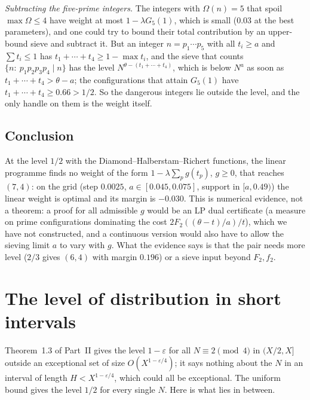 \documentclass[11pt,a4paper]{article}
\theoremstyle{remark}
\theoremstyle{definition}
\newcommand{\e}{\varepsilon}
\begin{document}
\emph{Subtracting the five-prime integers.} The integers with $\Omega(n)=5$ that spoil $\max\Omega\le4$ have weight at most $1-\lambda G_5(1)$, which is small ($0.03$ at the best parameters), and one could try to bound their total contribution by an upper-bound sieve and subtract it. But an integer $n=p_1\cdots p_5$ with all $t_i\ge a$ and $\sum t_i\le1$ has $t_1+\cdots+t_4\ge1-\max t_i$, and the sieve that counts $\{n:\ p_1p_2p_3p_4\mid n\}$ has the level $N^{\theta-(t_1+\cdots+t_4)}$, which is below $N^{a}$ as soon as $t_1+\cdots+t_4>\theta-a$; the configurations that attain $G_5(1)$ have $t_1+\cdots+t_4\ge0.66>1/2$. So the dangerous integers lie outside the level, and the only handle on them is the weight itself.

\subsection{Conclusion}
At the level $1/2$ with the Diamond--Halberstam--Richert functions, the linear programme finds no weight of the form $1-\lambda\sum_pg(t_p)$, $g\ge0$, that reaches $(7,4)$: on the grid (step $0.0025$, $a\in[0.045,0.075]$, support in $[a,0.49)$) the linear weight is optimal and its margin is $-0.030$. This is numerical evidence, not a theorem: a proof for all admissible $g$ would be an LP dual certificate (a measure on prime configurations dominating the cost $2F_2((\theta-t)/a)/t$), which we have not constructed, and a continuous version would also have to allow the sieving limit $a$ to vary with $g$. What the evidence says is that the pair needs more level ($2/3$ gives $(6,4)$ with margin $0.196$) or a sieve input beyond $F_2,f_2$.

\section{The level of distribution in short intervals}

Theorem~1.3 of Part~II gives the level $1-\e$ for all $N\equiv2\pmod4$ in $(X/2,X]$ outside an exceptional set of size $O(X^{1-\e/4})$; it says nothing about the $N$ in an interval of length $H<X^{1-\e/4}$, which could all be exceptional. The uniform bound gives the level $1/2$ for every single $N$. Here is what lies in between.
\end{document}
